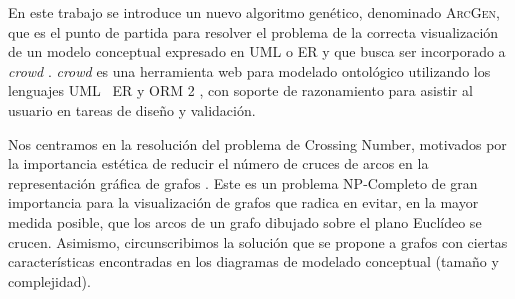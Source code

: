 	
	
	
	
	En este trabajo se introduce un nuevo algoritmo  genético,  denominado \textsc{ArcGen},  que es el  punto de partida  para  resolver el problema de la correcta visualización de un modelo conceptual expresado en UML o  ER  y que busca ser incorporado a {\it crowd} \cite{gimenez2016crowd}. {\it crowd} es una herramienta web para modelado ontológico utilizando los lenguajes  UML \cite{booch2005unified}\,  ER \cite{chen1988entity} y ORM 2 \cite{halpin2005orm}, con soporte de razonamiento para asistir al usuario en tareas de diseño y validación. 
	
	Nos centramos en la resolución del problema de Crossing Number, motivados por la  importancia  estética de reducir el número de cruces de arcos en la representación gráfica de grafos \cite{Kob14}. Este es un problema NP-Completo \cite{garey1983crossing} de gran importancia para la visualización de grafos que radica en evitar, en la mayor medida posible, que los arcos de un grafo dibujado sobre el plano Euclídeo se crucen.
	Asimismo, circunscribimos la solución que se propone  a grafos con ciertas características encontradas en los diagramas de modelado conceptual (tamaño y complejidad).
	
	
